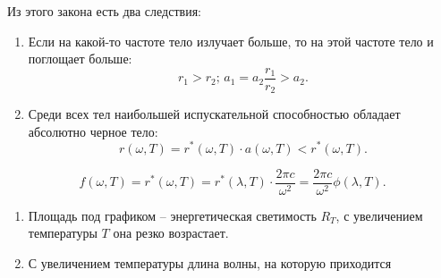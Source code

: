     Из этого закона есть два следствия:
    \begin{enumerate}
    \item Если на какой-то частоте тело излучает больше, то на этой частоте тело и поглощает больше:
    \[ r_1 > r_2;\, a_1 = a_2\frac{r_1}{r_2} > a_2. \]
    \item Среди всех тел наибольшей испускательной способностью обладает абсолютно черное тело:
    \[ r(\omega, T) = r^*(\omega, T)\cdot a(\omega, T) < r^*(\omega, T). \]
    \end{enumerate}
    
    
    \[ f(\omega, T) = r^*(\omega, T) = r^*(\lambda, T)\cdot\frac{2\pi c}{\omega^2} = \frac{2\pi c}{\omega^2} \phi(\lambda, T). \]
    \begin{enumerate}
    \item Площадь под графиком -- энергетическая светимость \( R_T \), с увеличением температуры \( T \) она резко возрастает.
    \item С увеличением температуры длина волны, на которую приходится 
    \end{enumerate}